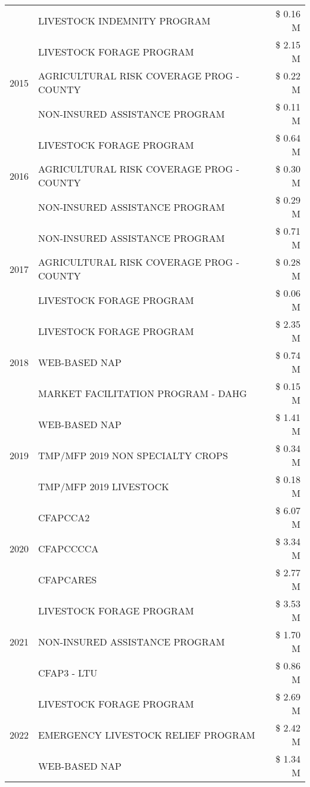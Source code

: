 \begin{tabular}{llr}
 & LIVESTOCK INDEMNITY PROGRAM & \$ 0.16 M \\
\cline{1-3}
\multirow[t]{3}{*}{2015} & LIVESTOCK FORAGE PROGRAM & \$ 2.15 M \\
 & AGRICULTURAL RISK COVERAGE PROG - COUNTY & \$ 0.22 M \\
 & NON-INSURED ASSISTANCE PROGRAM & \$ 0.11 M \\
\cline{1-3}
\multirow[t]{3}{*}{2016} & LIVESTOCK FORAGE PROGRAM & \$ 0.64 M \\
 & AGRICULTURAL RISK COVERAGE PROG - COUNTY & \$ 0.30 M \\
 & NON-INSURED ASSISTANCE PROGRAM & \$ 0.29 M \\
\cline{1-3}
\multirow[t]{3}{*}{2017} & NON-INSURED ASSISTANCE PROGRAM & \$ 0.71 M \\
 & AGRICULTURAL RISK COVERAGE PROG - COUNTY & \$ 0.28 M \\
 & LIVESTOCK FORAGE PROGRAM & \$ 0.06 M \\
\cline{1-3}
\multirow[t]{3}{*}{2018} & LIVESTOCK FORAGE PROGRAM & \$ 2.35 M \\
 & WEB-BASED NAP & \$ 0.74 M \\
 & MARKET FACILITATION PROGRAM - DAHG & \$ 0.15 M \\
\cline{1-3}
\multirow[t]{3}{*}{2019} & WEB-BASED NAP & \$ 1.41 M \\
 & TMP/MFP 2019 NON SPECIALTY CROPS & \$ 0.34 M \\
 & TMP/MFP 2019 LIVESTOCK & \$ 0.18 M \\
\cline{1-3}
\multirow[t]{3}{*}{2020} & CFAPCCA2 & \$ 6.07 M \\
 & CFAPCCCCA & \$ 3.34 M \\
 & CFAPCARES & \$ 2.77 M \\
\cline{1-3}
\multirow[t]{3}{*}{2021} & LIVESTOCK FORAGE PROGRAM & \$ 3.53 M \\
 & NON-INSURED ASSISTANCE PROGRAM & \$ 1.70 M \\
 & CFAP3 - LTU & \$ 0.86 M \\
\cline{1-3}
\multirow[t]{3}{*}{2022} & LIVESTOCK FORAGE PROGRAM & \$ 2.69 M \\
 & EMERGENCY LIVESTOCK RELIEF PROGRAM & \$ 2.42 M \\
 & WEB-BASED NAP & \$ 1.34 M \\
\cline{1-3}
\bottomrule
\end{tabular}
